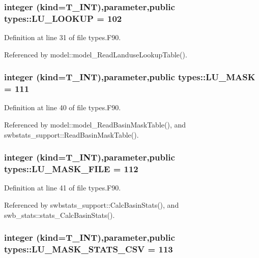 \hypertarget{namespacetypes_ae0b1a59e6856a4e2976c65cfe6e7829a}{
\subsubsection[{LU\_\-LOOKUP}]{\setlength{\rightskip}{0pt plus 5cm}integer (kind={\bf T\_\-INT}),parameter,public {\bf types::LU\_\-LOOKUP} = 102}}
\label{namespacetypes_ae0b1a59e6856a4e2976c65cfe6e7829a}


Definition at line 31 of file types.F90.



Referenced by model::model\_\-ReadLanduseLookupTable().

\hypertarget{namespacetypes_adf298bd69751153dbb8bd21ec8bbc42b}{
\subsubsection[{LU\_\-MASK}]{\setlength{\rightskip}{0pt plus 5cm}integer (kind={\bf T\_\-INT}),parameter,public {\bf types::LU\_\-MASK} = 111}}
\label{namespacetypes_adf298bd69751153dbb8bd21ec8bbc42b}


Definition at line 40 of file types.F90.



Referenced by model::model\_\-ReadBasinMaskTable(), and swbstats\_\-support::ReadBasinMaskTable().

\hypertarget{namespacetypes_a6fbb2101460a97abcc5f4ee9055e7e63}{
\subsubsection[{LU\_\-MASK\_\-FILE}]{\setlength{\rightskip}{0pt plus 5cm}integer (kind={\bf T\_\-INT}),parameter,public {\bf types::LU\_\-MASK\_\-FILE} = 112}}
\label{namespacetypes_a6fbb2101460a97abcc5f4ee9055e7e63}


Definition at line 41 of file types.F90.



Referenced by swbstats\_\-support::CalcBasinStats(), and swb\_\-stats::stats\_\-CalcBasinStats().

\hypertarget{namespacetypes_abaf10a4311ff42ab5244e8246c6a5200}{
\subsubsection[{LU\_\-MASK\_\-STATS\_\-CSV}]{\setlength{\rightskip}{0pt plus 5cm}integer (kind={\bf T\_\-INT}),parameter,public {\bf types::LU\_\-MASK\_\-STATS\_\-CSV} = 113}}
\label{namespacetypes_abaf10a4311ff42ab5244e8246c6a5200}



